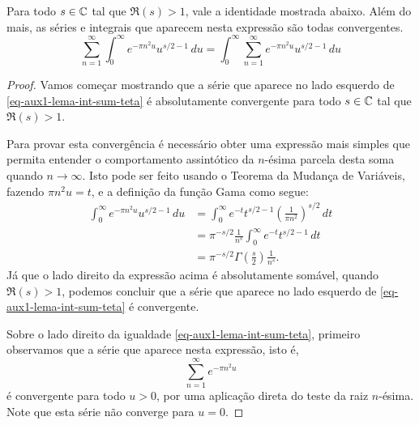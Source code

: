     \begin{lema}
    \label{lema-aux-teo-zeta-gamma-teta}
    Para todo $s\in \mathbb{C}$ tal que $\Re(s)>1$, vale a identidade mostrada abaixo. 
    Além do mais, as séries e integrais que aparecem nesta expressão são todas convergentes.
    \begin{equation}
        \label{eq-aux1-lema-int-sum-teta}
        \sum_{n=1}^{\infty}\int_0^{\infty} e^{-\pi n^2u}u^{s/2 - 1} \, du
        =
        \int_0^{\infty}\sum_{n=1}^{\infty} e^{-\pi n^2u}u^{s/2 - 1} \, du
    \end{equation}
    \end{lema}
    \begin{proof}
        Vamos começar mostrando que a série que aparece no lado 
        esquerdo de \eqref{eq-aux1-lema-int-sum-teta} é absolutamente convergente para todo $s\in \mathbb{C}$ tal que $\Re(s)>1$. 
        
        Para provar esta convergência é necessário 
        obter uma expressão mais simples que 
        permita entender o comportamento assintótico da $n$-ésima parcela 
        desta soma quando $n\to\infty$. 
        Isto pode ser feito usando o Teorema da Mudança de Variáveis,
        fazendo $\pi n^2 u = t$, e a definição da função Gama
        como segue:
        \begin{align}
        \label{eq-aux2-lema-int-sum-teta}
            \int_0^{\infty} e^{-\pi n^2u}u^{s/2 - 1} \, du 
            &= \int_0^{\infty} e^{-t}t^{s/2 - 1} \left( \frac{1}{\pi n^2} \right)^{s/2} \, dt 
            \nonumber\\[0.3cm]
            &= \pi^{-s/2}\frac{1}{n^s}\int_0^{\infty} e^{-t}t^{s/2 - 1} \, dt 
            \nonumber\\[0.3cm]
            &= \pi^{-s/2}\Gamma\left( \frac{s}{2} \right)\frac{1}{n^s}.
        \end{align}
        Já que o lado direito da expressão acima é absolutamente somável, 
        quando $\Re(s)>1$, podemos concluir que a série que 
        aparece no lado esquerdo 
        de \eqref{eq-aux1-lema-int-sum-teta} é convergente.
        
        
        Sobre o lado direito da igualdade \eqref{eq-aux1-lema-int-sum-teta},
        primeiro observamos que a série que aparece nesta expressão,
        isto é, 
        \[
        \sum_{n=1}^{\infty} e^{-\pi n^2u}
        \]
        é convergente para todo $u>0$, 
        por uma aplicação direta do teste da raiz $n$-ésima. 
        Note que esta série não converge para $u=0$.
        

\end{proof}
